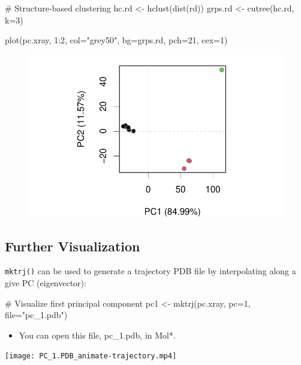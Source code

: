 \documentclass[
  letterpaper,
  DIV=11,
  numbers=noendperiod]{scrartcl}
\newenvironment{Shaded}{\begin{snugshade}}{\end{snugshade}}
\newcommand{\AttributeTok}[1]{\textcolor[rgb]{0.40,0.45,0.13}{#1}}
\newcommand{\CommentTok}[1]{\textcolor[rgb]{0.37,0.37,0.37}{#1}}
\newcommand{\DecValTok}[1]{\textcolor[rgb]{0.68,0.00,0.00}{#1}}
\newcommand{\FunctionTok}[1]{\textcolor[rgb]{0.28,0.35,0.67}{#1}}
\newcommand{\NormalTok}[1]{\textcolor[rgb]{0.00,0.23,0.31}{#1}}
\newcommand{\OtherTok}[1]{\textcolor[rgb]{0.00,0.23,0.31}{#1}}
\newcommand{\SpecialCharTok}[1]{\textcolor[rgb]{0.37,0.37,0.37}{#1}}
\newcommand{\StringTok}[1]{\textcolor[rgb]{0.13,0.47,0.30}{#1}}
\providecommand{\tightlist}{%
  \setlength{\itemsep}{0pt}\setlength{\parskip}{0pt}}\usepackage{longtable,booktabs,array}
\begin{document}
\begin{Shaded}
\begin{Highlighting}[]
\CommentTok{\# Structure{-}based clustering}
\NormalTok{hc.rd }\OtherTok{\textless{}{-}} \FunctionTok{hclust}\NormalTok{(}\FunctionTok{dist}\NormalTok{(rd))}
\NormalTok{grps.rd }\OtherTok{\textless{}{-}} \FunctionTok{cutree}\NormalTok{(hc.rd, }\AttributeTok{k=}\DecValTok{3}\NormalTok{)}

\FunctionTok{plot}\NormalTok{(pc.xray, }\DecValTok{1}\SpecialCharTok{:}\DecValTok{2}\NormalTok{, }\AttributeTok{col=}\StringTok{"grey50"}\NormalTok{, }\AttributeTok{bg=}\NormalTok{grps.rd, }\AttributeTok{pch=}\DecValTok{21}\NormalTok{, }\AttributeTok{cex=}\DecValTok{1}\NormalTok{)}
\end{Highlighting}
\end{Shaded}

\begin{figure}[H]

{\centering \includegraphics{Class09_html_files/figure-pdf/unnamed-chunk-15-1.pdf}

}

\end{figure}

\hypertarget{further-visualization}{%
\subsection{Further Visualization}\label{further-visualization}}

\texttt{mktrj()} can be used to generate a trajectory PDB file by
interpolating along a give PC (eigenvector):

\begin{Shaded}
\begin{Highlighting}[]
\CommentTok{\# Visualize first principal component}
\NormalTok{pc1 }\OtherTok{\textless{}{-}} \FunctionTok{mktrj}\NormalTok{(pc.xray, }\AttributeTok{pc=}\DecValTok{1}\NormalTok{, }\AttributeTok{file=}\StringTok{"pc\_1.pdb"}\NormalTok{)}
\end{Highlighting}
\end{Shaded}

\begin{itemize}
\tightlist
\item
  You can open this file, pc\_1.pdb, in Mol*.
\end{itemize}

\texttt{[image: PC\_1.PDB\_animate-trajectory.mp4]}
\end{document}
